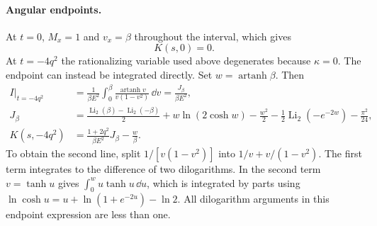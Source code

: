 \paragraph{Angular endpoints.}
At $t=0$, $M_x=1$ and $v_x=\beta$ throughout the interval, which gives
\begin{equation}
 K(s,0)=0.
\end{equation}
At $t=-4q^2$ the rationalizing variable used above degenerates because
$\kappa=0$. The endpoint can instead be integrated directly. Set
$w=\operatorname{artanh}\beta$. Then
\begin{align}
 I\big|_{t=-4q^2}
 &=\frac1{\beta E^2}\int_0^\beta
 \frac{\operatorname{artanh}v}{v(1-v^2)}\,\dd v
 =\frac{J_\beta}{\beta E^2},\\
 J_\beta&=\frac{\operatorname{Li}_2(\beta)-\operatorname{Li}_2(-\beta)}2
 +w\ln(2\cosh w)-\frac{w^2}2
 -\frac12\operatorname{Li}_2(-e^{-2w})-\frac{\pi^2}{24},\\
 K(s,-4q^2)&=\frac{1+2q^2}{\beta E^2}J_\beta-\frac w\beta.
 \label{eq:comp-soft-backward-endpoint}
\end{align}
To obtain the second line, split $1/[v(1-v^2)]$ into
$1/v+v/(1-v^2)$. The first term integrates to the difference of two
dilogarithms. In the second term $v=\tanh u$ gives
$\int_0^w u\tanh u\,\dd u$, which is integrated by parts using
$\ln\cosh u=u+\ln(1+e^{-2u})-\ln2$.
All dilogarithm arguments in this endpoint expression are less than one.


